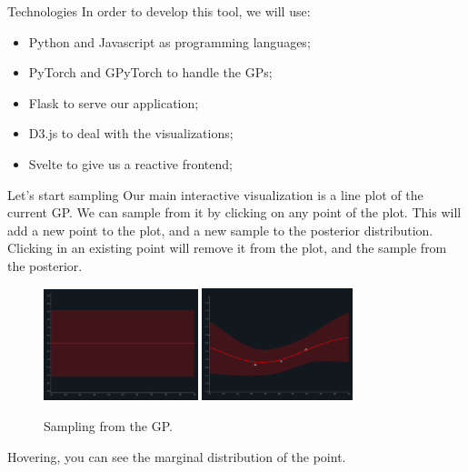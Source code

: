\documentclass[xcolor=dvipsnames,t,aspectratio=169]{beamer} %
\newcommand{\highlight}[1]{{\color{fgv_light_blue} #1}}
\begin{document}
\begin{frame}[c]{Technologies}
    In order to develop this tool, we will use:

    \begin{itemize}
        \item \highlight{Python} and \highlight{Javascript} as programming languages;
        \item \highlight{PyTorch} and \highlight{GPyTorch} to handle the GPs;
        \item \highlight{Flask} to \highlight{serve} our application;
        \item \highlight{D3.js} to deal with the \highlight{visualizations};
        \item \highlight{Svelte} to give us a \highlight{reactive} frontend;
    \end{itemize} 
    
\end{frame}

\begin{frame}[c]{Let's start \highlight{sampling}}
    Our main interactive visualization is a \highlight{line plot} of the current GP. We can \highlight{sample} from it by clicking on any point of the plot. This will add a new point to the plot, and a new sample to the \highlight{posterior} distribution. Clicking in an existing point will remove it from the plot, and the sample from the posterior.

    \begin{figure}[H]
        \centering
        \includegraphics[width=0.4\textwidth]{../imgs/observing.png}
        \includegraphics[width=0.39\textwidth]{../imgs/observed.png}
        \caption{Sampling from the GP.}
    \end{figure}

    Hovering, you can see the \highlight{marginal} distribution of the point.
\end{frame}
\end{document}
